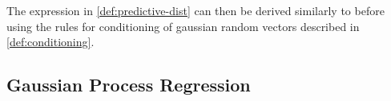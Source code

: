 The expression in \ref{def:predictive-dist} can then be derived similarly to before using the rules for
conditioning of gaussian random vectors described in \ref{def:conditioning}.

\subsection{Gaussian Process Regression}






%
%
%
%


%
%
%

